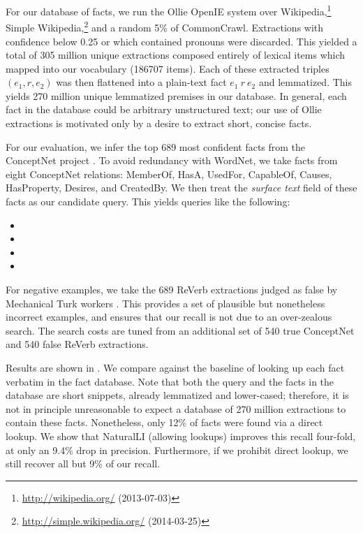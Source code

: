 For our database of facts, we run the Ollie OpenIE system
  \cite{key:2012mausam-ollie} over Wikipedia,\footnote{
    \url{http://wikipedia.org/} (2013-07-03)
  }
  Simple Wikipedia,\footnote{
    \url{http://simple.wikipedia.org/} (2014-03-25)
  }
  and a random \num{5}\% of CommonCrawl.
Extractions with confidence below 0.25 or which contained
  pronouns were discarded.
This yielded a total of 305 million unique extractions composed
  entirely of lexical items which mapped into our vocabulary
  (\num{186707} items).
Each of these extracted triples $(e_1,r,e_2)$ was then flattened into
  a plain-text fact $e_1~r~e_2$ and lemmatized.
This yields \num{270} million unique lemmatized premises in our database.
In general, each fact in the database could be arbitrary unstructured
  text; our use of Ollie extractions is motivated only by a desire to
  extract short, concise facts.

For our evaluation, we infer the top 689 most confident facts from
  the ConceptNet project \cite{key:2011tandon-conceptnet}.
To avoid redundancy with WordNet, we take facts from eight
  ConceptNet relations: 
    MemberOf,
    HasA,
    UsedFor,
    CapableOf,
    Causes,
    HasProperty,
    Desires, and 
    CreatedBy.
We then treat the \textit{surface text} field of these facts as our
  candidate query.
This yields queries like the following:

\vspace{-0.25em}
\begin{itemize}
\setlength{\itemsep}{-4pt}
\item[] 
\item[] 
\item[] 
\item[] 
\end{itemize}
\vspace{-0.25em}

For negative examples, we take the 689 ReVerb extractions
  \cite{key:2011fader-reverb}
  judged as false by Mechanical Turk workers \cite{key:2013angeli-truth}.
This provides a set of plausible but nonetheless incorrect examples,
  and ensures that our recall is not due to an over-zealous search.
The search costs are tuned from an additional set of 540 true ConceptNet and
  540 false ReVerb extractions.

Results are shown in .
We compare against the baseline of looking up each fact verbatim in the
  fact database.
Note that both the query and the facts in the database are 
  short snippets, already lemmatized and lower-cased;
  therefore, it is not in principle unreasonable to
  expect a database of 270 million extractions to contain these facts.
Nonetheless, only 12\% of facts were found via a direct lookup.
We show that NaturalLI (allowing lookups) improves this recall
  four-fold, at only an 9.4\% drop in precision.
Furthermore, if we prohibit direct lookup,
  we still recover all but 9\% of our recall.



